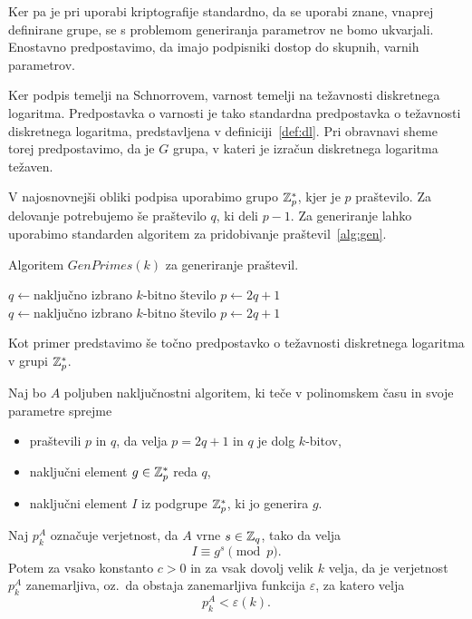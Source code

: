 Ker pa je pri uporabi kriptografije standardno, da se uporabi znane, vnaprej definirane grupe, se
s problemom generiranja parametrov ne bomo ukvarjali. Enostavno predpostavimo, da imajo podpisniki
dostop do skupnih, varnih parametrov.

Ker podpis temelji na Schnorrovem, varnost temelji na težavnosti diskretnega logaritma. Predpostavka
o varnosti je tako standardna predpostavka o težavnosti diskretnega logaritma, predstavljena v
definiciji~\ref{def:dl}. Pri obravnavi sheme torej predpostavimo, da je $G$ grupa, v kateri je
izračun diskretnega logaritma težaven.

\begin{primer}
    V najosnovnejši obliki podpisa uporabimo grupo $\mathbb Z_p^*$, kjer je $p$ praštevilo. Za delovanje
    potrebujemo še praštevilo $q$, ki deli $p - 1$. Za generiranje lahko uporabimo standarden algoritem
    za pridobivanje praštevil~\ref{alg:gen}.
    \begin{algorithm}
        \caption{Algoritem $GenPrimes(k)$ za generiranje praštevil.}
        \label{alg:gen}
        \begin{algorithmic}
            \State $q \gets \text{naključno izbrano $k$-bitno število}$
            \State $p \gets 2q + 1$
                \State $q \gets \text{naključno izbrano $k$-bitno število}$
                \State $p \gets 2q + 1$
            \EndWhile
            \State {}
        \end{algorithmic}
    \end{algorithm}

    Kot primer predstavimo še točno predpostavko o težavnosti diskretnega logaritma v grupi $\mathbb Z_p^*$.
    \begin{definicija}
    \label{def:asm_dlp}
        Naj bo $A$ poljuben naključnostni algoritem, ki teče v polinomskem času in svoje parametre sprejme 
        \begin{itemize}
            \item praštevili $p$ in $q$, da velja $p = 2q + 1$ in $q$ je dolg $k$-bitov,
            \item naključni element $g \in \mathbb Z_p^*$ reda $q$,
            \item naključni element $I$ iz podgrupe $\mathbb Z_p^*$, ki jo generira $g$.
        \end{itemize}
        Naj $p_k^A$ označuje verjetnost, da $A$ vrne $s \in \mathbb Z_q$, tako da velja
        $$
        I \equiv g^s \pmod p.
        $$
        Potem za vsako konstanto $c > 0$ in za vsak dovolj velik $k$ velja, da je verjetnost $p_k^A$
        zanemarljiva, oz.\ da obstaja zanemarljiva funkcija $\varepsilon$, za katero velja
        $$ 
        p_k^A < \varepsilon(k).
        $$
    \end{definicija}

\end{primer}

